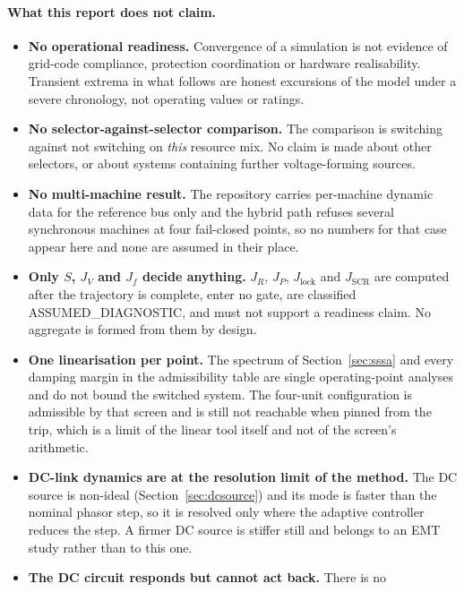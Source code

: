\documentclass[12pt,a4paper]{article}
\theoremstyle{remark}
\begin{document}
\paragraph{What this report does not claim.}
\begin{itemize}\itemsep1pt\parskip0pt
  \item \textbf{No operational readiness.} Convergence of a simulation is not
        evidence of grid-code compliance, protection coordination or hardware
        realisability. Transient extrema in what follows are honest excursions of
        the model under a severe chronology, not operating values or ratings.
  \item \textbf{No selector-against-selector comparison.} The comparison is
        switching against not switching on \emph{this} resource mix. No claim is
        made about other selectors, or about systems containing further
        voltage-forming sources.
  \item \textbf{No multi-machine result.} The repository carries per-machine
        dynamic data for the reference bus only and the hybrid path refuses
        several synchronous machines at four fail-closed points, so no numbers
        for that case appear here and none are assumed in their place.
  \item \textbf{Only $S$, $J_V$ and $J_f$ decide anything.} $J_R$, $J_P$,
        $J_{\mathrm{lock}}$ and $J_{\mathrm{SCR}}$ are computed after the
        trajectory is complete, enter no gate, are classified
        \textsf{ASSUMED\_DIAGNOSTIC}, and must not support a readiness claim. No
        aggregate is formed from them by design.
  \item \textbf{One linearisation per point.} The spectrum of
        Section~\ref{sec:sssa} and every damping margin in the admissibility
        table are single operating-point analyses and do not bound the switched
        system. The four-unit configuration is admissible by that screen and is
        still not reachable when pinned from the trip, which is a limit of the
        linear tool itself and not of the screen's arithmetic.
  \item \textbf{DC-link dynamics are at the resolution limit of the method.} The
        DC source is non-ideal (Section~\ref{sec:dcsource}) and its mode is
        faster than the nominal phasor step, so it is resolved only where the
        adaptive controller reduces the step. A firmer DC source is stiffer still
        and belongs to an EMT study rather than to this one.
  \item \textbf{The DC circuit responds but cannot act back.} There is no

\end{itemize}
\end{document}
